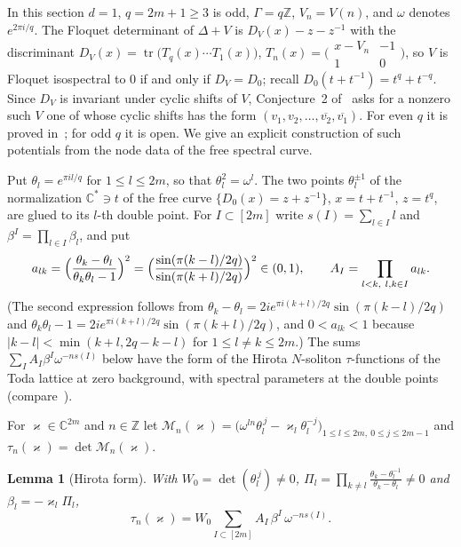 \documentclass[11pt,reqno]{amsart}
\newtheorem{lemma}[theorem]{Lemma}
\theoremstyle{definition}
\theoremstyle{remark}
\newcommand{\C}{\mathbb C}
\newcommand{\Z}{\mathbb Z}
\DeclareMathOperator{\tr}{tr}
\begin{document}
In this section $d=1$, $q=2m+1\ge3$ is odd, $\Gamma=q\Z$, $V_n=V(n)$, and
$\omega$ denotes $e^{2\pi i/q}$.  The Floquet determinant of $\Delta+V$ is
$D_V(x)-z-z^{-1}$ with the discriminant
$D_V(x)=\tr\bigl(T_q(x)\cdots T_1(x)\bigr)$, $T_n(x)=\bigl(\begin{smallmatrix}x-V_n&-1\\1&0\end{smallmatrix}\bigr)$,
so $V$ is Floquet isospectral to $0$ if and only if $D_V=D_0$; recall
$D_0(t+t^{-1})=t^q+t^{-q}$.  Since $D_V$ is invariant under cyclic shifts of
$V$, Conjecture~2 of~\cite{FFORS2026} asks for a nonzero such $V$ one of whose
cyclic shifts has the form $(v_1,v_2,\dots,\overline{v_2},\overline{v_1})$.
For even $q$ it is proved in~\cite{FFORS2026}; for odd $q$ it is open.  We give
an explicit construction of such potentials from the node data of the free
spectral curve.

Put $\theta_l=e^{\pi il/q}$ for $1\le l\le 2m$, so that $\theta_l^2=\omega^l$.
The two points $\theta_l^{\pm1}$ of the normalization $\C^*\ni t$ of the free
curve $\{D_0(x)=z+z^{-1}\}$, $x=t+t^{-1}$, $z=t^q$, are glued to its $l$-th
double point.  For $I\subset[2m]$ write $s(I)=\sum_{l\in I}l$ and
$\beta^I=\prod_{l\in I}\beta_l$, and put
\[
 a_{lk}=\Bigl(\frac{\theta_k-\theta_l}{\theta_k\theta_l-1}\Bigr)^2
 =\Bigl(\frac{\sin(\pi(k-l)/2q)}{\sin(\pi(k+l)/2q)}\Bigr)^2\in(0,1),\qquad
 A_I=\prod_{l<k,\ l,k\in I}a_{lk}.
\]
(The second expression follows from
$\theta_k-\theta_l=2ie^{\pi i(k+l)/2q}\sin(\pi(k-l)/2q)$ and
$\theta_k\theta_l-1=2ie^{\pi i(k+l)/2q}\sin(\pi(k+l)/2q)$, and $0<a_{lk}<1$
because $|k-l|<\min(k+l,2q-k-l)$ for $1\le l\ne k\le 2m$.)  The sums
$\sum_IA_I\beta^I\omega^{-ns(I)}$ below have the form of the Hirota
$N$-soliton $\tau$-functions of the Toda lattice at zero background, with
spectral parameters at the double points (compare~\cite{Toda1989,Teschl2000}).

For $\varkappa\in\C^{2m}$ and $n\in\Z$ let
$\mathcal M_n(\varkappa)=\bigl(\omega^{ln}\theta_l^{\,j}-\varkappa_l\theta_l^{-j}\bigr)_{1\le l\le 2m,\ 0\le j\le 2m-1}$
and $\tau_n(\varkappa)=\det\mathcal M_n(\varkappa)$.

\begin{lemma}[Hirota form]\label{lem:hirota}
With $W_0=\det(\theta_l^{\,j})\ne0$, $\Pi_l=\prod_{k\ne l}\frac{\theta_k-\theta_l^{-1}}{\theta_k-\theta_l}\ne0$
and $\beta_l=-\varkappa_l\Pi_l$,
\[
 \tau_n(\varkappa)=W_0\sum_{I\subset[2m]}A_I\,\beta^I\,\omega^{-ns(I)} .
\]
\end{lemma}
\end{document}
